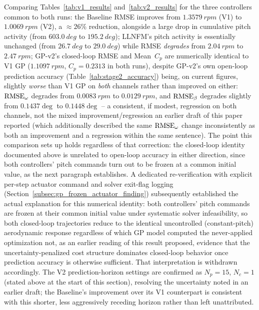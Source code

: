 Comparing Tables~\ref{tab:v1_results} and~\ref{tab:v2_results} for the
three controllers common to both runs: the Baseline RMSE improves from
$\SI{1.3579}{rpm}$ (V1) to $\SI{1.0069}{rpm}$ (V2), a $\approx 26\%$
reduction, alongside a large drop in cumulative pitch activity (from
$\SI{603.0}{deg}$ to $\SI{195.2}{deg}$); LLNFM's pitch activity is
essentially unchanged (from $\SI{26.7}{deg}$ to $\SI{29.0}{deg}$) while
RMSE \emph{degrades} from $\SI{2.04}{rpm}$ to
$\SI{2.47}{rpm}$; GP-v2's closed-loop RMSE and Mean~$C_p$ are numerically
identical to V1 GP ($\SI{1.1097}{rpm}$, $C_p=0.2313$ in both runs),
despite GP-v2's own open-loop prediction accuracy (Table~\ref{tab:stage2_accuracy})
being, on current figures, slightly \emph{worse} than V1 GP on
\emph{both} channels rather than improved on either: $\text{RMSE}_\omega$
degrades from $\SI{0.0083}{rpm}$ to $\SI{0.0129}{rpm}$, and
$\text{RMSE}_\beta$ degrades slightly from $0.1437\deg$ to $0.1448\deg$ --
a consistent, if modest, regression on both channels, not the mixed
improvement/regression an earlier draft of this paper reported (which
additionally described the same $\text{RMSE}_\omega$ change inconsistently
as both an improvement and a regression within the same sentence).
The point this comparison sets up holds regardless of that
correction: the closed-loop identity documented above is unrelated to
open-loop accuracy in either direction, since both controllers' pitch
commands turn out to be frozen at a common initial value, as the
next paragraph establishes. A dedicated re-verification with explicit
per-step actuator command and solver exit-flag logging
(Section~\ref{subsec:gp_frozen_actuator_finding}) subsequently
established the actual explanation for this numerical identity: both
controllers' pitch commands are frozen at their common initial value
under systematic solver infeasibility, so both closed-loop trajectories
reduce to the identical uncontrolled (constant-pitch) aerodynamic
response regardless of which GP model computed the never-applied
optimization  not, as an earlier reading of this result proposed,
evidence that the uncertainty-penalized cost structure dominates
closed-loop behavior once prediction accuracy is otherwise sufficient.
That interpretation is withdrawn accordingly. The V2 prediction-horizon
settings are confirmed as $N_p=15$, $N_c=1$ (stated above at the start of
this section), resolving the uncertainty noted in an earlier draft; the
Baseline's improvement over its V1 counterpart is consistent with this
shorter, less aggressively receding horizon rather than left unattributed.

